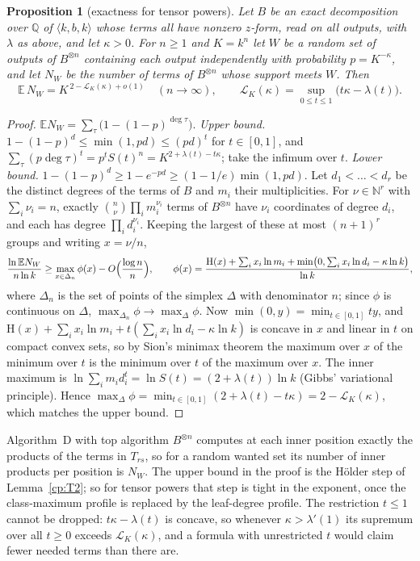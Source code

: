 \documentclass[11pt]{article}
\newtheorem{proposition}[theorem]{Proposition}
\theoremstyle{definition}
\theoremstyle{remark}
\providecommand{\Q}{\mathbb{Q}}
\providecommand{\N}{\mathbb{N}}
\newcommand{\Ent}{\mathrm{H}}                 %
\newcommand{\mat}[3]{\langle #1,#2,#3\rangle} %
\newcommand{\AlgD}{Algorithm~D}                             %
\newcommand{\Leg}{\mathcal{L}}                        %
\begin{document}
\begin{proposition}[exactness for tensor powers]\label{cp:F3}
Let $B$ be an exact decomposition over $\Q$ of $\mat kbk$ whose terms all have nonzero $z$-form, read on all outputs, with $\lambda$ as above, and let $\kappa>0$. For $n\ge1$ and $K=k^n$ let $W$ be a random set of outputs of $B^{\otimes n}$ containing each output independently with probability $p=K^{-\kappa}$, and let $N_W$ be the number of terms of $B^{\otimes n}$ whose support meets $W$. Then
\[
\mathbb E\,N_W=K^{\,2-\Leg_K(\kappa)+o(1)}\quad(n\to\infty),\qquad\Leg_K(\kappa)=\sup_{0\le t\le1}\bigl(t\kappa-\lambda(t)\bigr).
\]
\end{proposition}

\begin{proof}
$\mathbb E N_W=\sum_\tau\bigl(1-(1-p)^{\deg\tau}\bigr)$.
\emph{Upper bound.} $1-(1-p)^d\le\min(1,pd)\le(pd)^t$ for $t\in[0,1]$, and $\sum_\tau(p\deg\tau)^t=p^tS(t)^n=K^{2+\lambda(t)-t\kappa}$; take the infimum over $t$.
\emph{Lower bound.} $1-(1-p)^d\ge1-e^{-pd}\ge(1-1/e)\min(1,pd)$. Let $d_1<\dots<d_r$ be the distinct degrees of the terms of $B$ and $m_i$ their multiplicities. For $\nu\in\N^r$ with $\sum_i\nu_i=n$, exactly $\binom n\nu\prod_im_i^{\nu_i}$ terms of $B^{\otimes n}$ have $\nu_i$ coordinates of degree $d_i$, and each has degree $\prod_id_i^{\nu_i}$. Keeping the largest of these at most $(n+1)^r$ groups and writing $x=\nu/n$,
\[
\frac{\ln\mathbb EN_W}{n\ln k}\ge\max_{x\in\Delta_n}\phi(x)-O\Bigl(\frac{\log n}n\Bigr),\qquad\phi(x)=\frac{\Ent(x)+\sum_ix_i\ln m_i+\min\bigl(0,\sum_ix_i\ln d_i-\kappa\ln k\bigr)}{\ln k},
\]
where $\Delta_n$ is the set of points of the simplex $\Delta$ with denominator $n$; since $\phi$ is continuous on $\Delta$, $\max_{\Delta_n}\phi\to\max_\Delta\phi$. Now $\min(0,y)=\min_{t\in[0,1]}ty$, and $\Ent(x)+\sum_ix_i\ln m_i+t(\sum_ix_i\ln d_i-\kappa\ln k)$ is concave in $x$ and linear in $t$ on compact convex sets, so by Sion's minimax theorem the maximum over $x$ of the minimum over $t$ is the minimum over $t$ of the maximum over $x$. The inner maximum is $\ln\sum_im_id_i^t=\ln S(t)=(2+\lambda(t))\ln k$ (Gibbs' variational principle). Hence $\max_\Delta\phi=\min_{t\in[0,1]}(2+\lambda(t)-t\kappa)=2-\Leg_K(\kappa)$, which matches the upper bound.
\end{proof}

\AlgD{} with top algorithm $B^{\otimes n}$ computes at each inner position exactly the products of the terms in $T_{rs}$, so for a random wanted set its number of inner products per position is $N_W$. The upper bound in the proof is the Hölder step of Lemma~\ref{cp:T2}; so for tensor powers that step is tight in the exponent, once the class-maximum profile is replaced by the leaf-degree profile. The restriction $t\le1$ cannot be dropped: $t\kappa-\lambda(t)$ is concave, so whenever $\kappa>\lambda'(1)$ its supremum over all $t\ge0$ exceeds $\Leg_K(\kappa)$, and a formula with unrestricted $t$ would claim fewer needed terms than there are.
\end{document}

